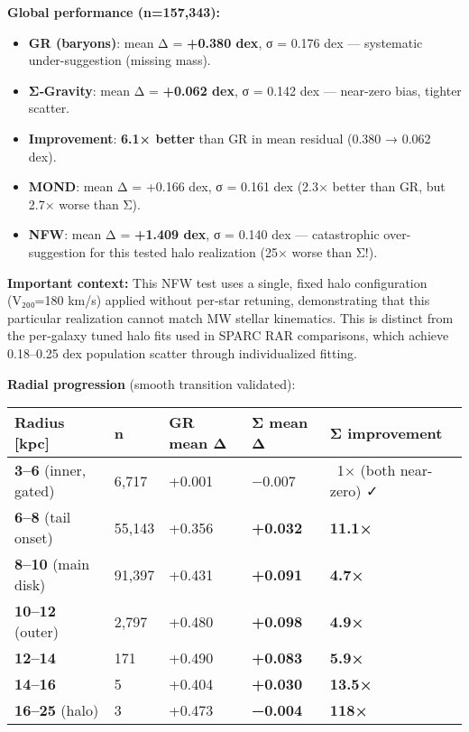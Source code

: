 \documentclass[11pt,a4paper]{article}
\begin{document}
\textbf{Global performance (n=157,343):}

\begin{itemize}
\item \textbf{GR (baryons)}: mean Δ = \textbf{+0.380 dex}, σ = 0.176 dex — systematic under-suggestion (missing mass).
\item \textbf{Σ‑Gravity}: mean Δ = \textbf{+0.062 dex}, σ = 0.142 dex — near-zero bias, tighter scatter.
\item \textbf{Improvement}: \textbf{6.1× better} than GR in mean residual (0.380 → 0.062 dex).
\item \textbf{MOND}: mean Δ = +0.166 dex, σ = 0.161 dex (2.3× better than GR, but 2.7× worse than Σ).
\item \textbf{NFW}: mean Δ = \textbf{+1.409 dex}, σ = 0.140 dex — catastrophic over-suggestion for this tested halo realization (25× worse than Σ!).
\end{itemize}


\textbf{Important context:} This NFW test uses a single, fixed halo configuration (V₂₀₀=180 km/s) applied without per‑star retuning, demonstrating that this particular realization cannot match MW stellar kinematics. This is distinct from the per‑galaxy tuned halo fits used in SPARC RAR comparisons, which achieve 0.18–0.25 dex population scatter through individualized fitting.


\textbf{Radial progression} (smooth transition validated):


\begin{table}[h]
\centering
\begin{tabular}{lllll}
\toprule
Radius [kpc] & n & GR mean Δ & Σ mean Δ & Σ improvement \\
\midrule
\textbf{3–6} (inner, gated) & 6,717 & +0.001 & −0.007 & ~1× (both near-zero) ✓ \\
\textbf{6–8} (tail onset) & 55,143 & +0.356 & \textbf{+0.032} & \textbf{11.1×} \\
\textbf{8–10} (main disk) & 91,397 & +0.431 & \textbf{+0.091} & \textbf{4.7×} \\
\textbf{10–12} (outer) & 2,797 & +0.480 & \textbf{+0.098} & \textbf{4.9×} \\
\textbf{12–14} & 171 & +0.490 & \textbf{+0.083} & \textbf{5.9×} \\
\textbf{14–16} & 5 & +0.404 & \textbf{+0.030} & \textbf{13.5×} \\
\textbf{16–25} (halo) & 3 & +0.473 & \textbf{−0.004} & \textbf{118×} \\
\bottomrule
\end{tabular}
\end{table}
\end{document}
